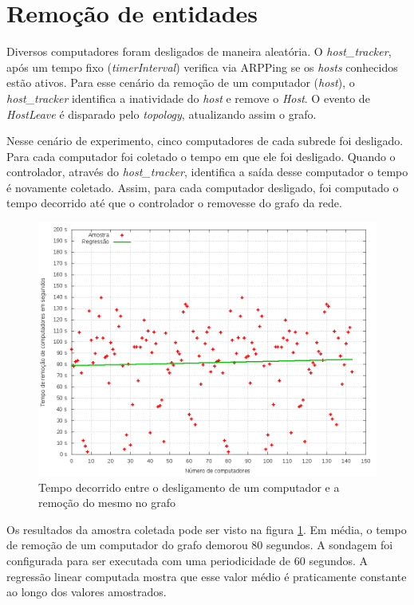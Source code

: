 \section{Remoção de entidades}

Diversos computadores foram desligados de maneira aleatória.
O \emph{host\_tracker}, após um tempo fixo (\emph{timerInterval}) 
verifica via ARPPing se os \emph{hosts} conhecidos estão ativos.
Para esse cenário da remoção de um computador (\emph{host}), 
o \emph{host\_tracker} identifica a inatividade do \emph{host} e remove o 
\emph{Host}.
O evento de \emph{HostLeave} é disparado pelo \emph{topology}, 
atualizando assim o grafo.

Nesse cenário de experimento, cinco computadores de cada subrede foi desligado.
Para cada computador foi coletado o tempo em que ele foi desligado.
Quando o controlador, através do \emph{host\_tracker}, identifica a saída 
desse computador o tempo é novamente coletado.
Assim, para cada computador desligado, foi computado o tempo decorrido até 
que o controlador o removesse do grafo da rede.

\begin{figure}[h!]
    \centering
    \label{fig:hosts-leave-time}
    \includegraphics[width=\linewidth]{img/hosts-leave-time}
    \caption{Tempo decorrido entre o desligamento de um computador e a 
    remoção do mesmo no grafo}
\end{figure}

Os resultados da amostra coletada pode ser visto na figura
\ref{fig:hosts-leave-time}.
Em média, o tempo de remoção de um computador do grafo demorou 80 segundos.
A sondagem foi configurada para ser executada com uma periodicidade de 60 
segundos. 
A regressão linear computada mostra que esse valor médio é praticamente 
constante ao longo dos valores amostrados.

